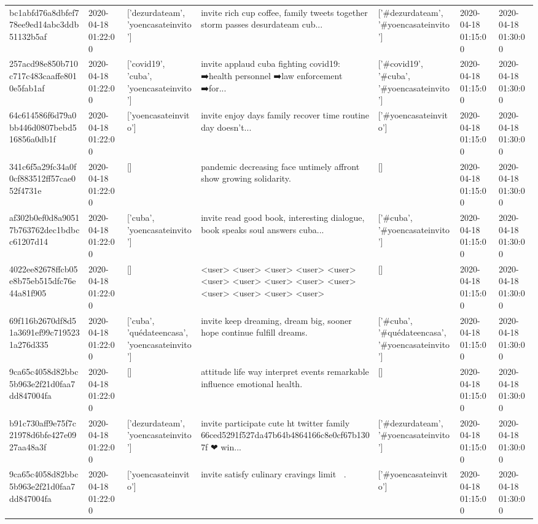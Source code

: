 \begin{tabular}{lllllll}
bc1abfd76a8dbfef778ee9ed14abc3ddb51132b5af & 2020-04-18 01:22:00 & ['dezurdateam', 'yoencasateinvito'] & invite rich cup coffee, family tweets together storm passes desurdateam cub... & ['#dezurdateam', '#yoencasateinvito'] & 2020-04-18 01:15:00 & 2020-04-18 01:30:00 \\
257acd98e850b710c717c483caaffe8010e5fab1af & 2020-04-18 01:22:00 & ['covid19', 'cuba', 'yoencasateinvito'] & invite applaud cuba fighting covid19: ➡️health personnel ➡️law enforcement ➡️for... & ['#covid19', '#cuba', '#yoencasateinvito'] & 2020-04-18 01:15:00 & 2020-04-18 01:30:00 \\
64c614586f6d79a0bb446d0807bebd516856a0db1f & 2020-04-18 01:22:00 & ['yoencasateinvito'] & invite enjoy days family recover time routine day doesn't... & ['#yoencasateinvito'] & 2020-04-18 01:15:00 & 2020-04-18 01:30:00 \\
341c6f5a29fc34a0f0cf883512ff57cae052f4731e & 2020-04-18 01:22:00 & [] & pandemic decreasing face untimely affront show growing solidarity. & [] & 2020-04-18 01:15:00 & 2020-04-18 01:30:00 \\
af302b0ef0d8a90517b763762dec1bdbcc61207d14 & 2020-04-18 01:22:00 & ['cuba', 'yoencasateinvito'] & invite read good book, interesting dialogue, book speaks soul answers cuba... & ['#cuba', '#yoencasateinvito'] & 2020-04-18 01:15:00 & 2020-04-18 01:30:00 \\
4022ee82678ffcb05e8b75eb515dfc76e44a81f905 & 2020-04-18 01:22:00 & [] & <user> <user> <user> <user> <user> <user> <user> <user> <user> <user> <user> <user> <user> <user> & [] & 2020-04-18 01:15:00 & 2020-04-18 01:30:00 \\
69f116b2670df8d51a3691ef99c7195231a276d335 & 2020-04-18 01:22:00 & ['cuba', 'quédateencasa', 'yoencasateinvito'] & invite keep dreaming, dream big, sooner hope continue fulfill dreams. & ['#cuba', '#quédateencasa', '#yoencasateinvito'] & 2020-04-18 01:15:00 & 2020-04-18 01:30:00 \\
9ca65c4058d82bbc5b963e2f21d0faa7dd847004fa & 2020-04-18 01:22:00 & [] & attitude life way interpret events remarkable influence emotional health. & [] & 2020-04-18 01:15:00 & 2020-04-18 01:30:00 \\
b91c730aff9e75f7c21978d6bfe427e0927aa48a3f & 2020-04-18 01:22:00 & ['dezurdateam', 'yoencasateinvito'] & invite participate cute ht twitter family 66ced5291f527da47b64b4864166c8e0cf67b1307f ❤ win... & ['#dezurdateam', '#yoencasateinvito'] & 2020-04-18 01:15:00 & 2020-04-18 01:30:00 \\
9ca65c4058d82bbc5b963e2f21d0faa7dd847004fa & 2020-04-18 01:22:00 & ['yoencasateinvito'] & invite satisfy culinary cravings limit 🤣🤣. & ['#yoencasateinvito'] & 2020-04-18 01:15:00 & 2020-04-18 01:30:00 \\

\end{tabular}
